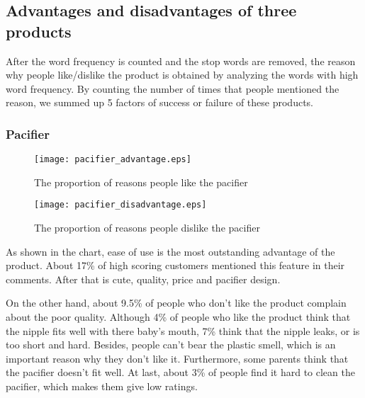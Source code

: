 \documentclass{mcmthesis}
\begin{document}
\subsection{Advantages and disadvantages of three products}
After the word frequency is counted and the stop words are removed, the reason why people like/dislike the product is obtained by analyzing the words with high word frequency.
By counting the number of times that people mentioned the reason, we summed up 5 factors of success or failure of these products.
\subsubsection{Pacifier}
\begin{figure}[H]
	\begin{minipage}[t]{0.5\textwidth}
		\centering
		\texttt{[image: pacifier\_advantage.eps]}
		\caption{The proportion of reasons people like the pacifier\label{fig:1}}
	\end{minipage}
	\qquad
	\begin{minipage}[t]{0.5\textwidth}
		\centering
		\texttt{[image: pacifier\_disadvantage.eps]}
		\caption{The proportion of reasons people dislike the pacifier\label{fig:2}}
	\end{minipage}
\end{figure}
\begin{flushleft}
	As shown in the chart, ease of use is the most outstanding advantage of the product. About 17\% of high scoring customers mentioned this feature in their comments. After that is cute, quality, price and pacifier design.
	
\end{flushleft}
\begin{flushleft}
	On the other hand, about 9.5\% of people who don't like the product complain
	about the poor quality. Although 4\% of people who like the product think that the nipple fits well with there baby's mouth, 7\%  think that the nipple leaks, or is too short and hard. Besides, people can't bear the plastic smell, which is an important reason why they don't like it. Furthermore, some parents think that the pacifier doesn't fit well. At last, about 3\% of people find it hard to clean the pacifier, which makes them give low ratings.
\end{flushleft}
\end{document}
